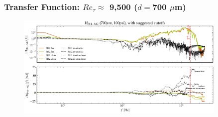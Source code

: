 \documentclass[aspectratio=169,9pt]{beamer}
\begin{document}




\begin{frame}
  \frametitle{Transfer Function: $Re_\tau \approx$ 9,500 ($d=$700 $\mu$m)}
  \begin{figure}
    \centering
    \includegraphics[width=0.9\textwidth]{tf_calib/700_100psi_H_2cal.png}
  \end{figure}
\end{frame}
\end{document}
